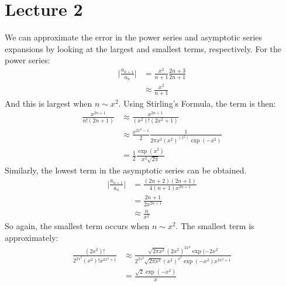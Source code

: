     \section{Lecture 2}
        We can approximate the error in the power series and
        asymptotic series expansions by looking at the largest
        and smallest terms, respectively. For the power series:
        \begin{align}
            \Big|\frac{a_{n+1}}{a_{n}}\Big|
            &=\frac{x^{2}}{n+1}\frac{2n+3}{2n+1}\\
            &\approx\frac{x^{2}}{n+1}
        \end{align}
        And this is largest when $n\sim{x}^{2}$.
        Using Stirling's Formula, the term is then:
        \begin{align}
            \frac{x^{2n+1}}{n!(2n+1)}
            &\approx\frac{x^{2n+1}}{(x^{2})!(2x^{2}+1)}\\
            &\approx\frac{x^{2x^{2}-1}}{2}
            \frac{1}{2\pi{x}^{2}(x^{2})^{(x^{2})}\exp(-x^{2})}\\
            &=\frac{1}{2}\frac{\exp(x^{2})}{x^{2}\sqrt{2\pi}}
        \end{align}
        Similarly, the lowest term in the asymptotic series
        can be obtained.
        \begin{align}
            \Big|\frac{a_{n+1}}{a_{n}}\Big|
            &=\frac{(2n+2)(2n+1)}{4(n+1)x^{2n+1}}\\
            &=\frac{2n+1}{2x^{2n+1}}\\
            &\approx\frac{n}{x^{2}}
        \end{align}
        So again, the smallest term occurs when
        $n\sim{x}^{2}$. The smallest term is approximately:
        \begin{align}
            \frac{(2x^{2})!}{2^{2x^{2}}(x^{2})!x^{2x^{2}+1}}
            &\approx
            \frac{\sqrt{2\pi{x}^{2}}(2x^{2})^{2x^{2}}\exp(-2x^{2}}
                 {2^{2x^{2}}\sqrt{2\pi{x}^{2}}(x^{2})^{x^{2}}
                  \exp(-x^{2})x^{2x^{2}+1}}\\
            &=\frac{\sqrt{2}\exp(-x^{2})}{x}
        \end{align}

